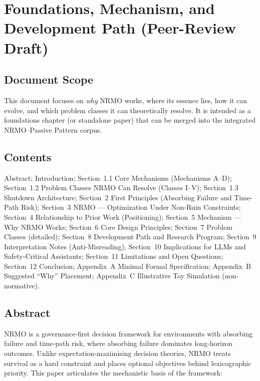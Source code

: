 
\chapter{Foundations, Mechanism, and Development Path
(Peer-Review Draft)}
\label{ch:foundations-paper}

\section*{Document Scope}

This document focuses on \emph{why} NRMO works, where its essence
lies, how it can evolve, and which problem classes it can
theoretically resolve. It is intended as a foundations chapter (or
standalone paper) that can be merged into the integrated
NRMO--Passive Pattern corpus.

\section*{Contents}

Abstract; Introduction; Section~1.1 Core Mechanisms (Mechanisms A--D);
Section~1.2 Problem Classes NRMO Can Resolve (Classes I--V);
Section~1.3 Shutdown Architecture; Section~2 First Principles
(Absorbing Failure and Time-Path Risk); Section~3 NRMO --- Optimization
Under Non-Ruin Constraints; Section~4 Relationship to Prior Work
(Positioning); Section~5 Mechanism --- Why NRMO Works;
Section~6 Core Design Principles; Section~7 Problem Classes
(detailed); Section~8 Development Path and Research Program;
Section~9 Interpretation Notes (Anti-Misreading); Section~10
Implications for LLMs and Safety-Critical Assistants; Section~11
Limitations and Open Questions; Section~12 Conclusion;
Appendix~A Minimal Formal Specification; Appendix~B Suggested
``Why'' Placement; Appendix~C Illustrative Toy Simulation
(non-normative).

\section*{Abstract}

NRMO is a governance-first decision framework for environments with
absorbing failure and time-path risk, where absorbing failure
dominates long-horizon outcomes. Unlike expectation-maximising
decision theories, NRMO treats survival as a hard constraint and
places optional objectives behind lexicographic priority. This paper
articulates the mechanistic basis of the framework:

